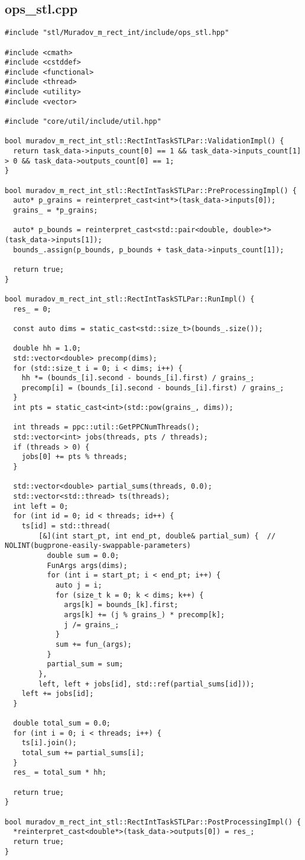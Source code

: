 \documentclass[12pt,a4paper]{extarticle}
\begin{document}
\subsection{ops\_stl.cpp}
\begin{lstlisting}
#include "stl/Muradov_m_rect_int/include/ops_stl.hpp"

#include <cmath>
#include <cstddef>
#include <functional>
#include <thread>
#include <utility>
#include <vector>

#include "core/util/include/util.hpp"

bool muradov_m_rect_int_stl::RectIntTaskSTLPar::ValidationImpl() {
  return task_data->inputs_count[0] == 1 && task_data->inputs_count[1] > 0 && task_data->outputs_count[0] == 1;
}

bool muradov_m_rect_int_stl::RectIntTaskSTLPar::PreProcessingImpl() {
  auto* p_grains = reinterpret_cast<int*>(task_data->inputs[0]);
  grains_ = *p_grains;

  auto* p_bounds = reinterpret_cast<std::pair<double, double>*>(task_data->inputs[1]);
  bounds_.assign(p_bounds, p_bounds + task_data->inputs_count[1]);

  return true;
}

bool muradov_m_rect_int_stl::RectIntTaskSTLPar::RunImpl() {
  res_ = 0;

  const auto dims = static_cast<std::size_t>(bounds_.size());

  double hh = 1.0;
  std::vector<double> precomp(dims);
  for (std::size_t i = 0; i < dims; i++) {
    hh *= (bounds_[i].second - bounds_[i].first) / grains_;
    precomp[i] = (bounds_[i].second - bounds_[i].first) / grains_;
  }
  int pts = static_cast<int>(std::pow(grains_, dims));

  int threads = ppc::util::GetPPCNumThreads();
  std::vector<int> jobs(threads, pts / threads);
  if (threads > 0) {
    jobs[0] += pts % threads;
  }

  std::vector<double> partial_sums(threads, 0.0);
  std::vector<std::thread> ts(threads);
  int left = 0;
  for (int id = 0; id < threads; id++) {
    ts[id] = std::thread(
        [&](int start_pt, int end_pt, double& partial_sum) {  // NOLINT(bugprone-easily-swappable-parameters)
          double sum = 0.0;
          FunArgs args(dims);
          for (int i = start_pt; i < end_pt; i++) {
            auto j = i;
            for (size_t k = 0; k < dims; k++) {
              args[k] = bounds_[k].first;
              args[k] += (j % grains_) * precomp[k];
              j /= grains_;
            }
            sum += fun_(args);
          }
          partial_sum = sum;
        },
        left, left + jobs[id], std::ref(partial_sums[id]));
    left += jobs[id];
  }

  double total_sum = 0.0;
  for (int i = 0; i < threads; i++) {
    ts[i].join();
    total_sum += partial_sums[i];
  }
  res_ = total_sum * hh;

  return true;
}

bool muradov_m_rect_int_stl::RectIntTaskSTLPar::PostProcessingImpl() {
  *reinterpret_cast<double*>(task_data->outputs[0]) = res_;
  return true;
}
\end{lstlisting}
\end{document}
